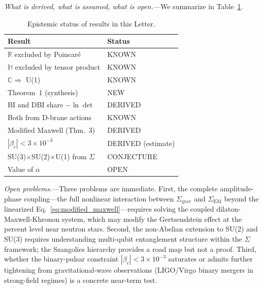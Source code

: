 \documentclass[prl,twocolumn,superscriptaddress,longbibliography]{revtex4-2}
\newcommand{\Sgrav}{\Sigma_{\mathrm{grav}}}
\newcommand{\Sem}{\Sigma_{\mathrm{EM}}}
\begin{document}
\textit{What is derived, what is assumed, what is open.}---We
summarize in Table~\ref{tab:status}.

\begin{table}[b]
\caption{Epistemic status of results in this Letter.}
\label{tab:status}
\begin{ruledtabular}
\begin{tabular}{ll}
  Result & Status \\
  \midrule
  $\mathbb{R}$ excluded by Poincar\'{e}
    & KNOWN~\cite{MorettiOppio2017} \\[2pt]
  $\mathbb{H}$ excluded by tensor product
    & KNOWN~\cite{AdelmanCortzen1969} \\[2pt]
  $\mathbb{C} \Rightarrow$ U(1)
    & KNOWN~\cite{DoplicherRoberts1990} \\[2pt]
  Theorem~1 (synthesis)
    & NEW \\[2pt]
  BI and DBI share $-\ln\det$
    & DERIVED \\[2pt]
  Both from D-brane actions
    & KNOWN~\cite{Polchinski1998} \\[2pt]
  Modified Maxwell (Thm.~3)
    & DERIVED \\[2pt]
  $|\beta_c| < 3\times 10^{-3}$
    & DERIVED (estimate) \\[2pt]
  SU(3)$\times$SU(2)$\times$U(1) from $\Sigma$
    & CONJECTURE \\[2pt]
  Value of $\alpha$
    & OPEN \\
\end{tabular}
\end{ruledtabular}
\end{table}

\textit{Open problems.}---Three problems are immediate.
First, the complete amplitude-phase coupling---the full nonlinear
interaction between $\Sgrav$ and $\Sem$ beyond the linearized
Eq.~\eqref{eq:modified_maxwell}---requires solving the coupled
dilaton-Maxwell-Khronon system, which may modify the
Gertsenshtein effect at the percent level near neutron stars.
Second, the non-Abelian extension to SU(2) and SU(3) requires
understanding multi-qubit entanglement structure within the
$\Sigma$ framework; the Szangolies hierarchy provides a road
map but not a proof.
Third, whether the binary-pulsar constraint
$|\beta_c| < 3 \times 10^{-3}$ saturates or admits further
tightening from gravitational-wave observations (LIGO/Virgo
binary mergers in strong-field regimes) is a concrete near-term
test.

\end{document}
